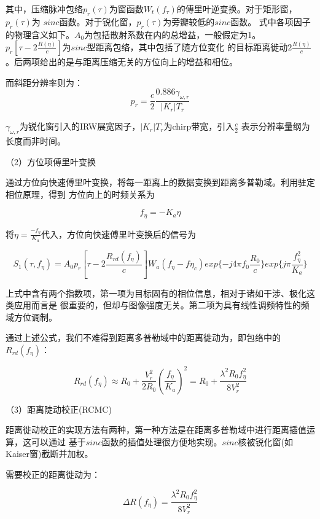 \documentclass{article}
\begin{document}
其中，压缩脉冲包络$p_r(\tau)$为窗函数$W_t(f_\tau)$的傅里叶逆变换。对于矩形窗，
$p_r(\tau)$为
$sinc$函数。对于锐化窗，$p_r(\tau)$为旁瓣较低的$sinc$函数。
式中各项因子的物理含义如下。$A_0$为包括散射系数在内的总增益，一般假定为1。
$p_r [\tau - 2\frac{R(\eta)}{c}]$为$sinc$型距离包络，其中包括了随方位变化
的目标距离徙动$2\frac{R(\eta)}{c}$。后两项给出的是与距离压缩无关的方位向上的增益和相位。


而斜距分辨率则为：
\begin{equation}
	p_r = \frac{c}{2} \frac{0.886 \gamma_{\omega,r}}{|K_r|T_r}
\end{equation}

$\gamma_{\omega,r}$为锐化窗引入的IRW展宽因子，$|K_r|T_r$为chirp带宽，引入$\frac{c}{2}$
表示分辨率量纲为长度而非时间。

（2）方位项傅里叶变换

通过方位向快速傅里叶变换，将每一距离上的数据变换到距离多普勒域。利用驻定相位原理，得到
方位向上的时频关系为

\begin{equation}
	f_\eta = -K_a \eta
\end{equation}

将$\eta = \frac{-f_\eta}{K_a}$代入，方位向快速傅里叶变换后的信号为

\begin{equation}
	S_1( \tau, f_{\eta} ) = A_0 p_r [\tau - 2\frac{R_{rd}(f_{\eta})}{c}] W_a (f_{\eta} - f{\eta_{c}}) exp \{ -j4 \pi f_0 \frac{R_0}{c} \}exp\{j \pi \frac{f_{\eta}^2}{K_a}\}
\end{equation}

上式中含有两个指数项，第一项为目标固有的相位信息，相对于诸如干涉、极化这类应用而言是
很重要的，但却与图像强度无关。第二项为具有线性调频特性的频域方位调制。

通过上述公式，我们不难得到距离多普勒域中的距离徙动为，即包络中的$R_{rd}(f_{\eta})$：

\begin{equation}
	R_{rd}(f_{\eta}) \approx R_0 + \frac{V_{r}^{2}}{2R_0}(\frac{f_\eta}{K_a})^2 = R_0 + \frac{\lambda^2R_0f_{\eta}^2}{8V_{r}^{2}}
\end{equation}

（3）距离陡动校正(RCMC)

距离徙动校正的实现方法有两种，第一种方法是在距离多普勒域中进行距离插值运算，这可以通过
基于$sinc$函数的插值处理很方便地实现。$sinc$核被锐化窗(如Kaiser窗)截断并加权。

需要校正的距离徙动为：

\begin{equation}
 	\Delta R(f_\eta)=\frac{\lambda^2R_0f_{\eta}^2}{8V_{r}^{2}}
\end{equation}
\end{document}
